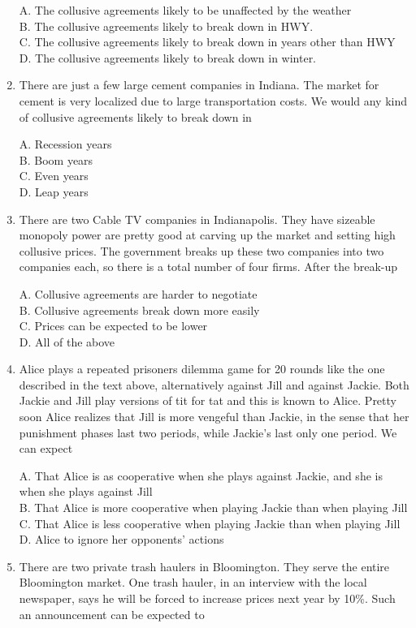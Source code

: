 \documentclass[
]{book}
\begin{document}
\begin{enumerate}
  A. The collusive agreements likely to be unaffected by the weather\\
  B. The collusive agreements likely to break down in HWY.\\
  C. The collusive agreements likely to break down in years other than HWY\\
  D. The collusive agreements likely to break down in winter.
\item
  There are just a few large cement companies in Indiana. The market for cement is very localized due to large transportation costs. We would any kind of collusive agreements likely to break down in

  A. Recession years\\
  B. Boom years\\
  C. Even years\\
  D. Leap years
\item
  There are two Cable TV companies in Indianapolis. They have sizeable monopoly power are pretty good at carving up the market and setting high collusive prices. The government breaks up these two companies into two companies each, so there is a total number of four firms. After the break-up

  A. Collusive agreements are harder to negotiate\\
  B. Collusive agreements break down more easily\\
  C. Prices can be expected to be lower\\
  D. All of the above
\item
  Alice plays a repeated prisoners dilemma game for 20 rounds like the one described in the text above, alternatively against Jill and against Jackie. Both Jackie and Jill play versions of tit for tat and this is known to Alice. Pretty soon Alice realizes that Jill is more vengeful than Jackie, in the sense that her punishment phases last two periods, while Jackie's last only one period. We can expect

  A. That Alice is as cooperative when she plays against Jackie, and she is when she plays against Jill\\
  B. That Alice is more cooperative when playing Jackie than when playing Jill\\
  C. That Alice is less cooperative when playing Jackie than when playing Jill\\
  D. Alice to ignore her opponents' actions
\item
  There are two private trash haulers in Bloomington. They serve the entire Bloomington market. One trash hauler, in an interview with the local newspaper, says he will be forced to increase prices next year by 10\%. Such an announcement can be expected to


\end{enumerate}
\end{document}
